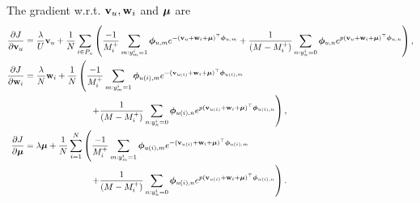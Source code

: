 The gradient w.r.t. $\mathbf{v}_u, \mathbf{w}_i$ and $\bm{\mu}$ are
\begin{equation*}
\begin{aligned}
\frac{\partial J}{\partial \mathbf{v}_u}
&= \frac{\lambda}{U} \mathbf{v}_u + \frac{1}{N} \sum_{i \in P_u} \left( 
   \frac{-1}{M_i^+} \sum_{m: y_m^i = 1} \bm{\phi}_{u,m} e^{-(\mathbf{v}_{u} + \mathbf{w}_i + \bm{\mu})^\top \bm{\phi}_{u,m}}
   + \frac{1}{(M - M_i^+)} \sum_{n: y_n^i = 0} \bm{\phi}_{u,n} e^{p (\mathbf{v}_{u} + \mathbf{w}_i + \bm{\mu})^\top \bm{\phi}_{u,n}} \right), \\
\frac{\partial J}{\partial \mathbf{w}_i}
&= \frac{\lambda}{N} \mathbf{w}_i + \frac{1}{N} \left( 
   \frac{-1}{M_i^+} \sum_{m: y_m^i = 1} \bm{\phi}_{u(i),m} e^{-(\mathbf{v}_{u(i)} + \mathbf{w}_i + \bm{\mu})^\top \bm{\phi}_{u(i),m}} \right. \\
& \hspace{7.5em} \left.
   + \frac{1}{(M - M_i^+)} \sum_{n: y_n^i = 0} \bm{\phi}_{u(i),n} e^{p (\mathbf{v}_{u(i)} + \mathbf{w}_i + \bm{\mu})^\top \bm{\phi}_{u(i),n}} \right), \\
\frac{\partial J}{\partial \bm{\mu}}
&= \lambda \bm{\mu} + \frac{1}{N} \sum_{i=1}^N \left( 
   \frac{-1}{M_i^+} \sum_{m: y_m^i = 1} \bm{\phi}_{u(i),m} e^{-(\mathbf{v}_{u(i)} + \mathbf{w}_i + \bm{\mu})^\top \bm{\phi}_{u(i),m}} \right. \\
& \hspace{7.5em} \left.
   + \frac{1}{(M - M_i^+)} \sum_{n: y_n^i = 0} \bm{\phi}_{u(i),n} e^{p (\mathbf{v}_{u(i)} + \mathbf{w}_i + \bm{\mu})^\top \bm{\phi}_{u(i),n}} \right).
\end{aligned}
\end{equation*}
